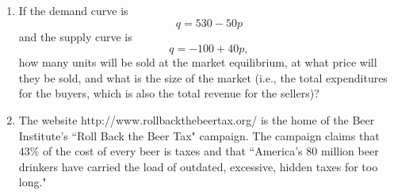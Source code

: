 \documentclass{article}
\begin{document}
\begin{enumerate}
\begin{comment}
    \begin{enumerate}
    \item The elimination of vocational programs that teach people how to use bulldozers.
    \item A huge increase in the number of well-paying service-sector jobs such as computer programming.
    \item A fall in the price of bulldozers and other construction equipment. (To state the obvious: bulldozers and bulldozer operators are complements, like bread and butter or computers and monitors.)
    \item An increase in the wage for unskilled laborers. (To state the less obvious: skilled labor (e.g., workers who can use bulldozers) and unskilled labor (e.g., workers who can only use shovels) are substitutes, as are tea and coffee and planes, trains, and automobiles.)
    \end{enumerate}\end{EXAM}

\begin{KEY}
    \begin{enumerate}
    \item Supply decreases. Equilibrium price up, quantity down.
    \item Supply decreases. Equilibrium price up, quantity down.
    \item Demand increases. Equilibrium price up, quantity up.
    \item Demand increases. Equilibrium price up, quantity up.
    \end{enumerate}
\end{KEY}
\end{comment}

\item \begin{EXAM} If the demand curve is 
\[q=530-50p\]
and the supply curve is 
\[q=-100 + 40p,\]
how many units will be sold at the market equilibrium, at what price will they be sold, and what is the size of the market (i.e., the total expenditures for the buyers, which is also the total revenue for the sellers)? \end{EXAM}


\clearpage



\item The website http://www.rollbackthebeertax.org/ is the home of the Beer Institute's ``Roll Back the Beer Tax" campaign. The campaign claims that 43\% of the cost of every beer is taxes and that ``America's 80 million beer drinkers have carried the load of outdated, excessive, hidden taxes for too long."


\end{enumerate}
\end{document}
